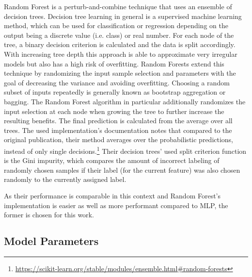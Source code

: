 \documentclass[
    fontsize=12pt,
    headings=small,
    parskip=half,           %
    bibliography=totoc,
    numbers=noenddot,       %
    open=any,               %
    final,                   %
    table
]{scrreprt}
\begin{document}
Random Forest \cite{Breiman2001} is a perturb-and-combine technique that uses an ensemble of decision trees. Decision tree learning in general is a supervised machine learning method, which can be used for classification or regression depending on the output being a discrete value (i.e. class) or real number. For each node of the tree, a binary decision criterion is calculated and the data is split accordingly. With increasing tree depth this approach is able to approximate very irregular models but also has a high risk of overfitting. Random Forests extend this technique by randomizing the input sample selection and parameters with the goal of decreasing the variance and avoiding overfitting. Choosing a random subset of inputs repeatedly is generally known as bootstrap  aggregation or bagging. The Random Forest algorithm in particular additionally randomizes the input selection at each node when growing the tree to further increase the resulting benefits. The final prediction is calculated from the average over all trees. The used implementation's documentation notes that compared to the original publication, their method averages over the probabilistic predictions, instead of only single decisions.\footnote{\url{https://scikit-learn.org/stable/modules/ensemble.html\#random-forests}} Their decision trees' used split criterion function is the Gini impurity, which compares the amount of incorrect labeling of randomly chosen samples if their label (for the current feature) was also chosen randomly to the currently assigned label.

As their performance is comparable in this context and Random Forest's implementation is easier as well as more performant compared to MLP, the former is chosen for this work.

\subsection{Model Parameters}
\end{document}
